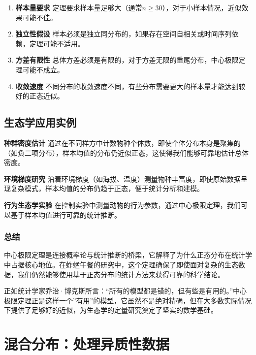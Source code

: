 \documentclass[
]{book}
\begin{document}
\begin{enumerate}
\def\labelenumi{\arabic{enumi}.}
\item
  \textbf{样本量要求}
  定理要求样本量足够大（通常\(n \geq 30\)），对于小样本情况，近似效果可能不佳。
\item
  \textbf{独立性假设}
  样本必须是独立同分布的，如果存在空间自相关或时间序列依赖，定理可能不适用。
\item
  \textbf{方差有限性}
  总体方差必须是有限的，对于方差无限的重尾分布，中心极限定理可能不成立。
\item
  \textbf{收敛速度}
  不同分布的收敛速度不同，有些分布需要更大的样本量才能达到较好的正态近似。
\end{enumerate}

\hypertarget{ux751fux6001ux5b66ux5e94ux7528ux5b9eux4f8b}{%
\subsection{生态学应用实例}\label{ux751fux6001ux5b66ux5e94ux7528ux5b9eux4f8b}}

\textbf{种群密度估计}
通过在不同样方中计数物种个体数，即使个体分布本身是聚集的（如负二项分布），样本均值的分布仍近似正态，这使得我们能够可靠地估计总体密度。

\textbf{环境梯度研究}
沿着环境梯度（如海拔、温度）测量物种丰富度，即使原始数据呈现复杂模式，样本均值的分布仍趋于正态，便于统计分析和建模。

\textbf{行为生态学实验}
在控制实验中测量动物的行为参数，通过中心极限定理，我们可以基于样本均值进行可靠的统计推断。

\hypertarget{ux603bux7ed3-1}{%
\subsubsection{总结}\label{ux603bux7ed3-1}}

中心极限定理是连接概率论与统计推断的桥梁，它解释了为什么正态分布在统计学中占据核心地位。在蚱蜢午餐的研究中，这个定理确保了即使面对复杂的生态数据，我们仍然能够使用基于正态分布的统计方法来获得可靠的科学结论。

正如统计学家乔治·博克斯所言：``所有的模型都是错的，但有些是有用的。''中心极限定理正是这样一个''有用''的模型，它虽然不是绝对精确，但在大多数实际情况下提供了足够好的近似，为生态学的定量研究奠定了坚实的数学基础。

\hypertarget{ux6df7ux5408ux5206ux5e03ux5904ux7406ux5f02ux8d28ux6027ux6570ux636e}{%
\section{混合分布：处理异质性数据}\label{ux6df7ux5408ux5206ux5e03ux5904ux7406ux5f02ux8d28ux6027ux6570ux636e}}
\end{document}
